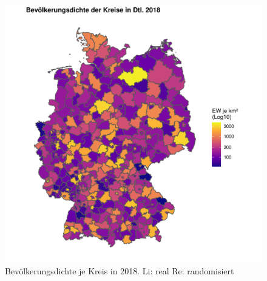 \begin{figure}[htb]
\begin{minipage}[b]{.45\linewidth}
       \includegraphics[width=\linewidth,trim={2cm 1cm 1cm 1cm},clip]{body/figures/popdens2018-rdm.pdf}
    \end{minipage}
    \caption[Randomisierte Bevölkerungsdichten]{Bevölkerungsdichte je Kreis in 2018. Li: real Re: randomisiert}
    \label{fig_densitymaps}
 \end{figure}

